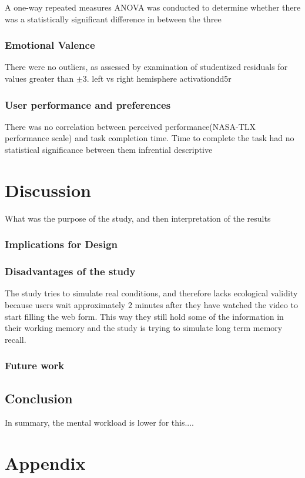 \documentclass[a4paper]{report}
\begin{document}
			A one-way repeated measures ANOVA was conducted to determine whether there was a statistically significant difference in  between the three
		\subsection{Emotional Valence}
				There were no outliers, as assessed by examination of studentized residuals for values greater than $\pm$3.
				left vs right hemisphere activationdd5r
			\subsection{User performance and preferences}
			There was no correlation between perceived performance(NASA-TLX performance scale) and task completion time.
			Time to complete the task had no statistical significance between them
			infrential
			descriptive
\chapter{Discussion}
	What was the purpose of the study, and then interpretation of the results
		\subsection{Implications for Design}
		\subsection{Disadvantages of the study}
		The study tries to simulate real conditions, and therefore lacks ecological validity because users wait approximately 2 minutes after they have watched the video to start filling the web form. This way they still hold some of the information in their working memory and the study is trying to simulate long term memory recall.
		\subsection{Future work}
	\section{Conclusion}
	In summary, the mental workload is lower for this....


	
	
\chapter*{Appendix}
\end{document}
